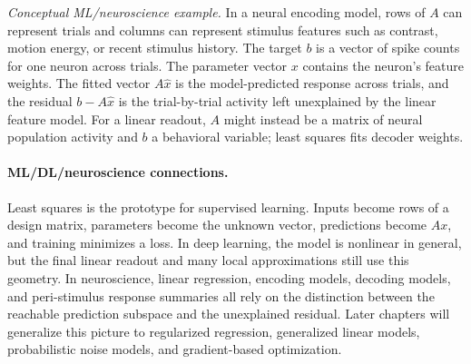 \emph{Conceptual ML/neuroscience example.} In a neural encoding model, rows of \(A\) can represent trials and columns can represent stimulus features such as contrast, motion energy, or recent stimulus history. The target \(b\) is a vector of spike counts for one neuron across trials. The parameter vector \(x\) contains the neuron's feature weights. The fitted vector \(A\hat x\) is the model-predicted response across trials, and the residual \(b-A\hat x\) is the trial-by-trial activity left unexplained by the linear feature model. For a linear readout, \(A\) might instead be a matrix of neural population activity and \(b\) a behavioral variable; least squares fits decoder weights.

\paragraph{ML/DL/neuroscience connections.}
Least squares is the prototype for supervised learning. Inputs become rows of a design matrix, parameters become the unknown vector, predictions become \(Ax\), and training minimizes a loss. In deep learning, the model is nonlinear in general, but the final linear readout and many local approximations still use this geometry. In neuroscience, linear regression, encoding models, decoding models, and peri-stimulus response summaries all rely on the distinction between the reachable prediction subspace and the unexplained residual. Later chapters will generalize this picture to regularized regression, generalized linear models, probabilistic noise models, and gradient-based optimization.

